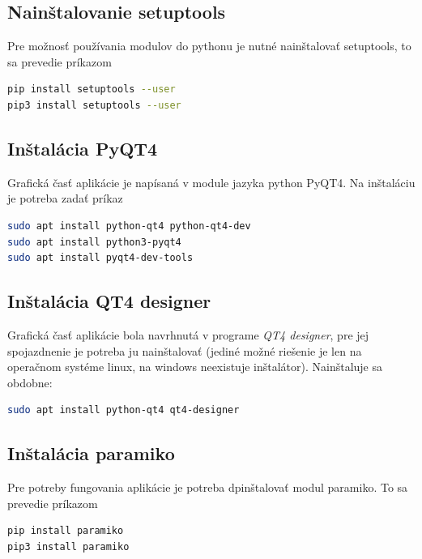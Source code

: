 \subsection{Nainštalovanie setuptools}
Pre možnosť používania modulov do pythonu je nutné nainštalovať setuptools, to sa prevedie príkazom
\begin{lstlisting}[language=bash, frame=single, caption=Nainštalovanie setuptools,captionpos=b, showstringspaces=false, basicstyle=\footnotesize]
pip install setuptools --user
pip3 install setuptools --user
\end{lstlisting}
\subsection{Inštalácia PyQT4}
Grafická časť aplikácie je napísaná v module jazyka python PyQT4. Na inštaláciu je potreba zadať príkaz
\begin{lstlisting}[language=bash, frame=single, caption=Nainštalovanie pyqt4,captionpos=b, showstringspaces=false, basicstyle=\footnotesize]
sudo apt install python-qt4 python-qt4-dev
sudo apt install python3-pyqt4
sudo apt install pyqt4-dev-tools
\end{lstlisting}
\subsection{Inštalácia QT4 designer}
Grafická časť aplikácie bola navrhnutá v programe \textit{QT4 designer}, pre jej spojazdnenie je potreba ju nainštalovať (jediné možné riešenie je len na operačnom systéme linux, na windows neexistuje inštalátor). Nainštaluje sa obdobne:
\begin{lstlisting}[language=bash, frame=single, caption=Nainštalovanie qt4 designera,captionpos=b, showstringspaces=false, basicstyle=\footnotesize]
sudo apt install python-qt4 qt4-designer
\end{lstlisting}
\subsection{Inštalácia paramiko}
Pre potreby fungovania aplikácie je potreba dpinštalovať modul paramiko. To sa prevedie príkazom
\begin{lstlisting}[language=bash, frame=single, caption=Inštalácia paramiko,captionpos=b, showstringspaces=false, basicstyle=\footnotesize]
pip install paramiko
pip3 install paramiko
\end{lstlisting}
